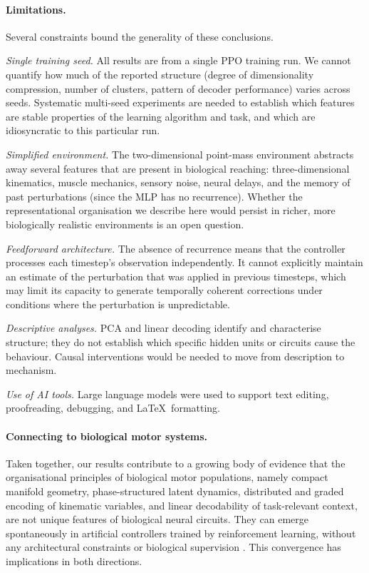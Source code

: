 \documentclass{article}
\begin{document}
\paragraph{Limitations.}

Several constraints bound the generality of these conclusions.

\textit{Single training seed.}
All results are from a single PPO training run.
We cannot quantify how much of the reported structure (degree of
dimensionality compression, number of clusters, pattern of decoder
performance) varies across seeds.
Systematic multi-seed experiments are needed to establish which features
are stable properties of the learning algorithm and task, and which are
idiosyncratic to this particular run.

\textit{Simplified environment.}
The two-dimensional point-mass environment abstracts away several features
that are present in biological reaching: three-dimensional kinematics, muscle
mechanics, sensory noise, neural delays, and the memory of past perturbations
(since the MLP has no recurrence).
Whether the representational organisation we describe here would persist
in richer, more biologically realistic environments is an open question.

\textit{Feedforward architecture.}
The absence of recurrence means that the controller processes each
timestep's observation independently.
It cannot explicitly maintain an estimate of the perturbation that was
applied in previous timesteps, which may limit its capacity to generate
temporally coherent corrections under conditions where the perturbation
is unpredictable.

\textit{Descriptive analyses.}
PCA and linear decoding identify and characterise structure; they do not
establish which specific hidden units or circuits cause the behaviour.
Causal interventions would be needed to move from description to mechanism.

\textit{Use of AI tools.}
Large language models were used to support text editing, proofreading,
debugging, and \LaTeX\ formatting.

\paragraph{Connecting to biological motor systems.}

Taken together, our results contribute to a growing body of evidence that
the organisational principles of biological motor populations, namely compact
manifold geometry, phase-structured latent dynamics, distributed and graded
encoding of kinematic variables, and linear decodability of task-relevant
context, are not unique features of biological neural circuits.
They can emerge spontaneously in artificial controllers trained by
reinforcement learning, without any architectural constraints or
biological supervision
\citep{Churchland2012,Gallego2017,Oby2019,Crevecoeur2019,Silver2016,Haarnoja2018,Mnih2015DQN}.
This convergence has implications in both directions.
\end{document}
